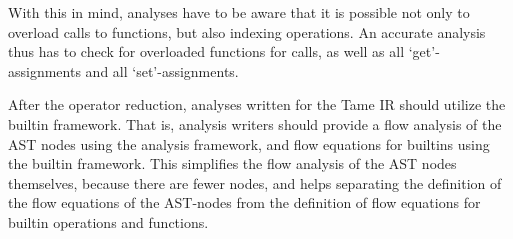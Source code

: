 With this in mind, analyses have to be aware that it is possible not only to
overload calls to functions, but also indexing operations. An accurate
analysis thus has to check for overloaded functions for calls, as well
as all `get'-assignments and all `set'-assignments.


After the operator reduction, analyses written for the Tame IR should
utilize the builtin framework.  That is, analysis writers should
provide a flow analysis of the AST nodes using the \mcsaf analysis
framework, and flow equations for builtins using the builtin
framework.  This simplifies the flow analysis of the AST nodes
themselves, because there are fewer nodes, and helps separating 
the definition of the flow equations of the AST-nodes
from
the definition of flow equations for builtin operations and functions.



